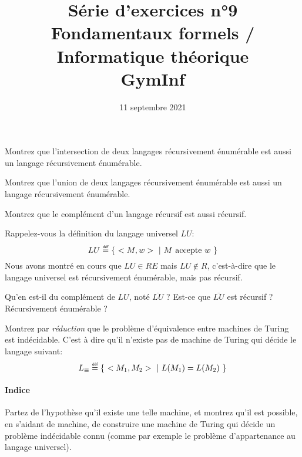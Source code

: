 \documentclass[12pt,french,a4paper]{article}
\newcommand\eqdef{\mathrel{\overset{\makebox[0pt]{\mbox{\normalfont\tiny\sffamily déf}}}{=}}}
\begin{document}
\title{\vspace{-2cm}Série d'exercices n°9\\\large{Fondamentaux formels / Informatique théorique\\GymInf}}
\date{\vspace{-1cm}11 septembre 2021}

\maketitle

\begin{question}
Montrez que l'intersection de deux langages récursivement énumérable est aussi un langage récursivement énumérable.
\end{question}

\vspace{1cm}

\begin{question}
Montrez que l'union de deux langages récursivement énumérable est aussi un langage récursivement énumérable.
\end{question}

\vspace{1cm}

\begin{question}
Montrez que le complément d'un langage récursif est aussi récursif.
\end{question}

\vspace{1.5cm}

\begin{question}
Rappelez-vous la définition du langage universel $LU$:
\[
LU \eqdef  \{\ <M, w>\ |\ M\text{ accepte }w\ \}
\]
Nous avons montré en cours que $LU \in RE$ mais $LU \not\in R$, c'est-à-dire que le langage universel est récursivement énumérable, mais pas récursif.

Qu'en est-il du complément de $LU$, noté $\overline{LU}$ ?
Est-ce que $\overline{LU}$ est récursif ? Récursivement énumérable ?
\end{question}

\vspace{1.5cm}

\begin{question}
Montrez par \textit{réduction} que le problème d'équivalence entre machines de Turing est indécidable.
C'est à dire qu'il n'existe pas de machine de Turing qui décide le langage suivant:
\[
L_{\equiv} \eqdef \{\ <M_1, M_2>\ |\ L(M_1) = L(M_2)\ \}
\]

\paragraph{Indice} Partez de l'hypothèse qu'il existe une telle machine, et montrez qu'il est possible, en s'aidant de machine, de construire une machine de Turing qui décide un problème indécidable connu (comme par exemple le problème d'appartenance au langage universel).
\end{question}
\end{document}
